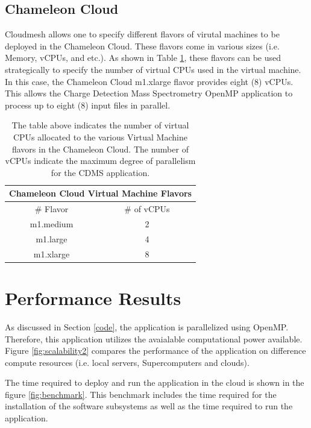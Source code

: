 \documentclass[9pt,twocolumn,twoside]{../../styles/osajnl}
\begin{document}
\subsection{Chameleon Cloud}
Cloudmesh allows one to specify different flavors of virutal machines
to be deployed in the Chameleon Cloud. These flavors come in various
sizes (i.e. Memory, vCPUs, and etc.). As shown in Table
\ref{tab:hadoop}, these flavors can be used strategically to specify
the number of virtual CPUs used in the virtual machine. In this case,
the Chameleon Cloud m1.xlarge flavor provides eight (8) vCPUs. This
allows the Charge Detection Mass Spectrometry OpenMP application to
process up to eight (8) input files in parallel.
\begin{table}[htbp]
\centering
\begin{tabular}{cc}
\multicolumn{2}{c}{\bf Chameleon Cloud Virtual Machine Flavors}\\
\hline
\# Flavor & \# of vCPUs \\
\hline
m1.medium & 2 \\
m1.large & 4 \\
m1.xlarge & 8 \\
\hline
\end{tabular}
\caption{The table above indicates the number of virtual CPUs
  allocated to the various Virtual Machine flavors in the Chameleon
  Cloud. The number of vCPUs indicate the maximum degree of
  parallelism for the CDMS application.}
\label{tab:hadoop}
\end{table}

\section{Performance Results} \label{performance}
As discussed in Section \ref{code}, the application is parallelized
using OpenMP. Therefore, this application utilizes the avaialable
computational power available. Figure \ref{fig:scalability2} compares
the performance of the application on difference compute resources
(i.e. local servers, Supercomputers and clouds).

The time required to deploy and run the application in the cloud is
shown in the figure \ref{fig:benchmark}. This benchmark includes the
time required for the installation of the software subsystems as well
as the time required to run the application.
\end{document}
